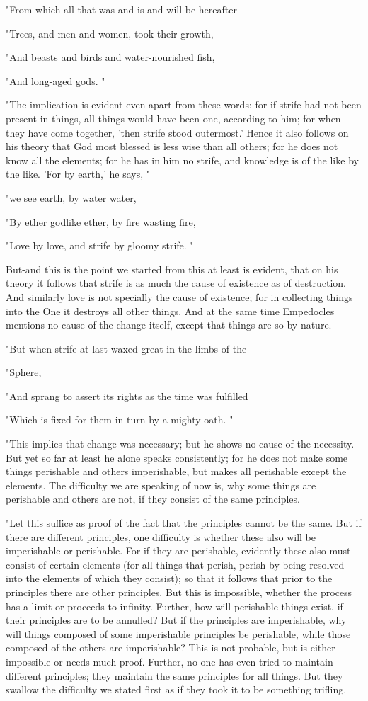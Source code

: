 "From which all that was and is and will be hereafter- 

"Trees, and men and women, took their growth, 

"And beasts and birds and water-nourished fish, 

"And long-aged gods. "

"The implication is evident even apart from these words; for if strife
had not been present in things, all things would have been one, according
to him; for when they have come together, 'then strife stood outermost.'
Hence it also follows on his theory that God most blessed is less
wise than all others; for he does not know all the elements; for he
has in him no strife, and knowledge is of the like by the like. 'For
by earth,' he says, "

"we see earth, by water water, 

"By ether godlike ether, by fire wasting fire, 

"Love by love, and strife by gloomy strife. "

But-and this is the point we started from this at least is evident,
that on his theory it follows that strife is as much the cause of
existence as of destruction. And similarly love is not specially the
cause of existence; for in collecting things into the One it destroys
all other things. And at the same time Empedocles mentions no cause
of the change itself, except that things are so by nature.

"But when strife at last waxed great in the limbs of the

"Sphere, 

"And sprang to assert its rights as the time was fulfilled

"Which is fixed for them in turn by a mighty oath. "

"This implies that change was necessary; but he shows no cause of
the necessity. But yet so far at least he alone speaks consistently;
for he does not make some things perishable and others imperishable,
but makes all perishable except the elements. The difficulty we are
speaking of now is, why some things are perishable and others are
not, if they consist of the same principles. 

"Let this suffice as proof of the fact that the principles cannot
be the same. But if there are different principles, one difficulty
is whether these also will be imperishable or perishable. For if they
are perishable, evidently these also must consist of certain elements
(for all things that perish, perish by being resolved into the elements
of which they consist); so that it follows that prior to the principles
there are other principles. But this is impossible, whether the process
has a limit or proceeds to infinity. Further, how will perishable
things exist, if their principles are to be annulled? But if the principles
are imperishable, why will things composed of some imperishable principles
be perishable, while those composed of the others are imperishable?
This is not probable, but is either impossible or needs much proof.
Further, no one has even tried to maintain different principles; they
maintain the same principles for all things. But they swallow the
difficulty we stated first as if they took it to be something trifling.

